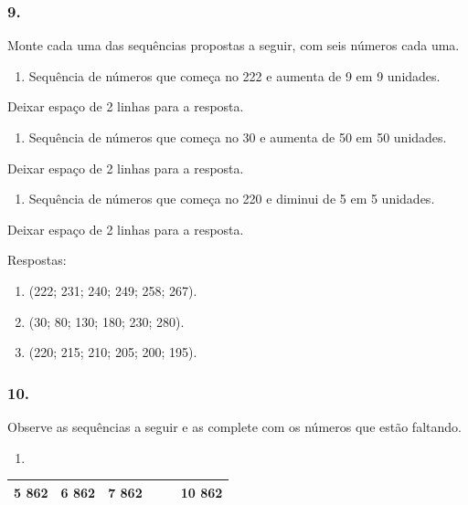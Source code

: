 \begin{enumerate}
\begin{escolha}
\begin{enumerate}
\subsubsection{9.}\label{section-34}

Monte cada uma das sequências propostas a seguir, com seis números cada uma.

\begin{enumerate}
\def\labelenumi{\alph{enumi})}
\item
  Sequência de números que começa no 222 e aumenta de 9 em 9 unidades.
\end{enumerate}

Deixar espaço de 2 linhas para a resposta.

\begin{enumerate}
\def\labelenumi{\alph{enumi})}
\item
  Sequência de números que começa no 30 e aumenta de 50 em 50 unidades.
\end{enumerate}

Deixar espaço de 2 linhas para a resposta.

\begin{enumerate}
\def\labelenumi{\alph{enumi})}
\item
  Sequência de números que começa no 220 e diminui de 5 em 5 unidades.
\end{enumerate}

Deixar espaço de 2 linhas para a resposta.

Respostas:

\begin{enumerate}
\def\labelenumi{\alph{enumi})}
\item
  (222; 231; 240; 249; 258; 267).
\item
  (30; 80; 130; 180; 230; 280).
\item
  (220; 215; 210; 205; 200; 195).
\end{enumerate}

\subsubsection{10.}\label{section-35}

Observe as sequências a seguir e as complete com os números que estão
faltando.

\begin{enumerate}
\def\labelenumi{\alph{enumi})}
\item
\end{enumerate}

\begin{longtable}[]{@{}llllll@{}}
\toprule
5 862 & 6 862 & 7 862 &  &  & 10 862\tabularnewline
\bottomrule
\end{longtable}


\end{enumerate}
\end{escolha}
\end{enumerate}

